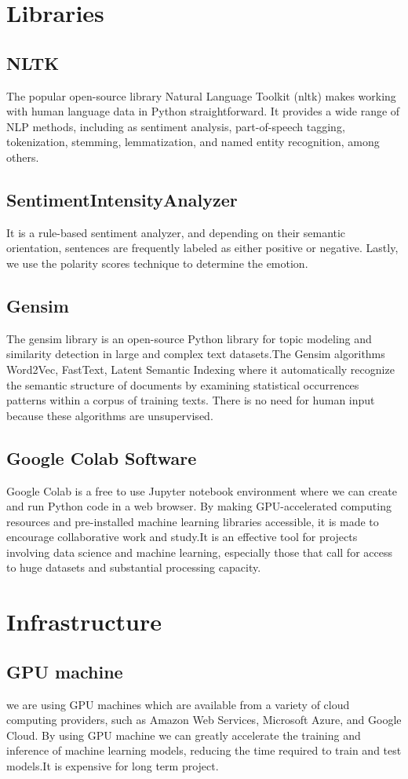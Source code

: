 \section{ Libraries }
\subsection{NLTK}
The popular open-source library  Natural Language Toolkit (nltk) makes working with human language data in Python straightforward. It provides a wide range of NLP methods, including as sentiment analysis, part-of-speech tagging, tokenization, stemming, lemmatization, and named entity recognition, among others.
\subsection{SentimentIntensityAnalyzer}
It is a rule-based sentiment analyzer, and depending on their semantic orientation, sentences are frequently labeled as either positive or negative. Lastly, we use the polarity scores technique to determine the emotion.
\subsection{Gensim}
The gensim library is an open-source Python library for topic modeling and similarity detection in large and complex text datasets.The Gensim algorithms Word2Vec, FastText, Latent Semantic Indexing where it automatically recognize the semantic structure of documents by examining statistical  occurrences patterns within a corpus of training texts. There is no need for human input because these algorithms are unsupervised.
\subsection{Google Colab Software}
Google Colab is a free to use Jupyter notebook environment where we can create and run Python code in a web browser. By making GPU-accelerated computing resources and pre-installed machine learning libraries accessible, it is made to encourage collaborative work and study.It is an effective  tool for projects involving data science and machine learning, especially those that call for access to huge datasets and substantial processing capacity.
\section{ Infrastructure }
\subsection{GPU machine}
we are using GPU machines which are  available from a variety of cloud computing providers, such as Amazon Web Services, Microsoft Azure, and Google Cloud. By using GPU machine we can greatly accelerate the training and inference of machine learning models, reducing the time required to train and test models.It is expensive for long term project.
